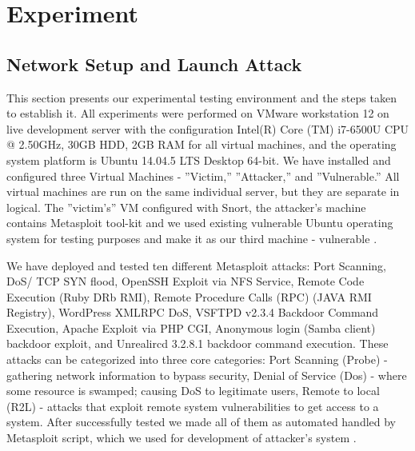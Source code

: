 \section{Experiment}
\label{experiment}


\subsection{Network Setup and Launch Attack}

This section presents our experimental testing environment and the steps taken to establish it. All experiments were performed on VMware workstation 12 on live development server with the configuration 
Intel(R) Core (TM) i7-6500U CPU @ 2.50GHz, 30GB HDD, 2GB RAM for all virtual machines, and the operating system platform is Ubuntu 14.04.5 LTS Desktop 64-bit. We have installed and configured three Virtual 
Machines - ''Victim,'' ''Attacker,'' and ''Vulnerable.'' All virtual machines are run on the same individual server, but they are separate in logical. The ''victim's'' VM configured with Snort, the 
attacker's machine contains Metasploit tool-kit and we used existing
vulnerable Ubuntu operating system for testing purposes and make it as our third machine - vulnerable \cite{misc:metasploitable}. 

We have deployed and tested ten different Metasploit attacks: Port
Scanning, DoS/ TCP SYN flood, OpenSSH Exploit via NFS Service, Remote Code Execution (Ruby DRb RMI), Remote Procedure Calls (RPC) (JAVA RMI Registry), WordPress XMLRPC DoS, VSFTPD v2.3.4 Backdoor Command
Execution, Apache Exploit via PHP CGI, Anonymous login (Samba client) backdoor exploit, and Unrealircd 3.2.8.1 backdoor command execution. These attacks can be categorized into three core categories: Port
Scanning (Probe) - gathering network information to bypass security, Denial of Service (Dos) - where some resource is swamped; causing DoS to legitimate users, Remote to local (R2L) - attacks that exploit
remote system vulnerabilities to get access to a system. After successfully tested we made all of them as automated handled by Metasploit script, which we used for development of attacker's system
\cite{misc:metasploitScripts}.



